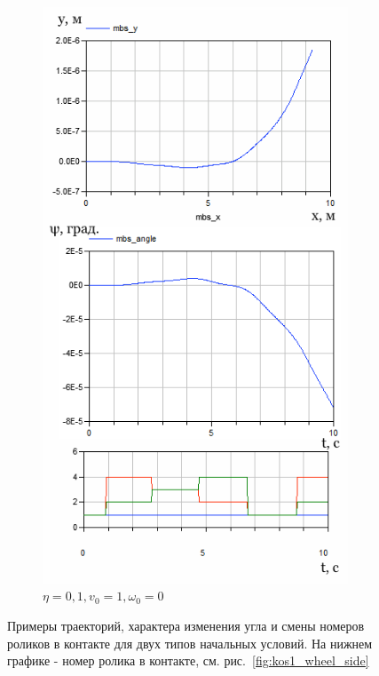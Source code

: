 \documentclass[12pt]{article}
\begin{document}
\begin{figure}[h!]
\begin{subfigure}{.47\textwidth}
\end{subfigure}%
\hspace{5pt}
\begin{subfigure}{.47\textwidth}
    \centering
    \includegraphics[width=\textwidth]{content/parts/3_friction/diploma/img/res/example_v_1_0_omega_0_frac_1e-1_n_4_time_10s.png}
    \caption{$\eta = 0,1, v_0 = 1, \omega_0 = 0$}
    \label{fig:exp_example_v}
\end{subfigure}
\caption{Примеры траекторий, характера изменения угла и смены номеров роликов в контакте для двух типов начальных условий. На нижнем графике - номер ролика в контакте, см. рис.~\ref{fig:kos1_wheel_side}}
\label{fig:exp_examples}
\end{figure}
\end{document}
